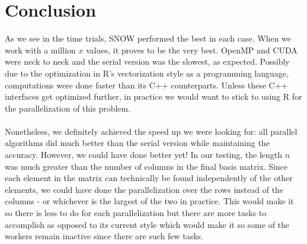 \section{Conclusion}
As we see in the time trials, SNOW performed the best in each case. When we work with a million $x$ values, it proves to be the very best. OpenMP and CUDA were neck to neck and the serial version was the slowest, as expected. Possibly due to the optimization in R's vectorization style as a programming language, computations were done faster than its C++ counterparts. Unless these C++ interfaces get optimized further, in practice we would want to stick to using R for the parallelization of this problem.
\\ \\
Nonetheless, we definitely achieved the speed up we were looking for: all parallel algorithms did much better than the serial version while maintaining the accuracy. However, we could have done better yet! In our testing, the length $n$ was much greater than the number of columns in the final basis matrix. Since each element in the matrix can technically be found independently of the other elements, we could have done the parallelization over the rows instead of the columns - or whichever is the largest of the two in practice. This would make it so there is less to do for each parallelization but there are more tasks to accomplish as opposed to its current style which would make it so some of the workers remain inactive since there are such few tasks.
